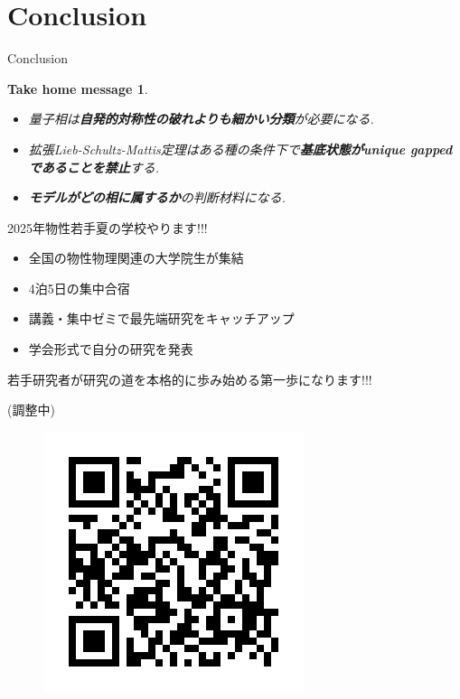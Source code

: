 \documentclass[dvipdfm]{beamer}
\newtheorem*{takehome}{Take home message}
\begin{document}
\section{Conclusion}

\begin{frame}{Conclusion}
    \begin{takehome}
        \begin{itemize}
            \item 量子相は\textbf{\alert{自発的対称性の破れよりも細かい分類}}が必要になる.
            \item 拡張Lieb-Schultz-Mattis定理はある種の条件下で\textbf{\alert{基底状態がunique gappedであることを禁止}}する.
            \item \textbf{\alert{モデルがどの相に属するか}}の判断材料になる.
        \end{itemize}
    \end{takehome}



\end{frame}

\begin{frame}{2025年物性若手夏の学校やります!!!}
    \begin{itemize}
        \item 全国の物性物理関連の大学院生が集結
        \item 4泊5日の集中合宿
        \item 講義・集中ゼミで最先端研究をキャッチアップ
        \item 学会形式で自分の研究を発表
    \end{itemize}
    若手研究者が研究の道を本格的に歩み始める第一歩になります!!!

    \textbf{}

    \textbf{}(調整中)
    \begin{figure}
        \centering
        \includegraphics[width=0.2\linewidth]{QR_736654.png}
    \end{figure}
\end{frame}
\end{document}
